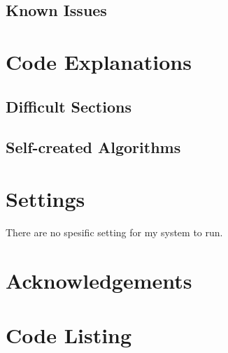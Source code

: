 \subsection{Known Issues}

\section{Code Explanations}

\subsection{Difficult Sections}

\subsection{Self-created Algorithms}

\section{Settings}
There are no spesific setting for my system to run.
\section{Acknowledgements}

\section{Code Listing}

